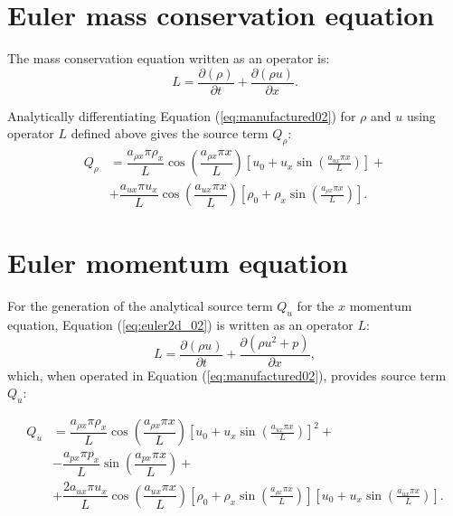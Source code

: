 \documentclass[10pt]{article}
\newcommand{\Diff}[2] {\dfrac{\partial( #1)}{\partial #2}}
\begin{document}
\section{Euler mass conservation equation}

The mass conservation equation written as an operator is:
\begin{equation}
 \label{eq:euler2d_11}
L= \Diff{\rho}{t} + \Diff{\rho u}{x}.
\end{equation}

Analytically differentiating Equation (\ref{eq:manufactured02}) for $\rho$ and $u$  using operator $L$ defined above gives  the source term $Q_{\rho}$:
\begin{equation}
\begin{split}
Q_\rho &=\dfrac{a_{\rho x} \pi \rho_x }{L} \cos\left( \dfrac{a_{\rho x} \pi x}{L} \right) \left[ u_{0}+u_{x} \sin\left(\frac{a_{u  x} \pi x}{L}\right) \right] +\\
&+\dfrac{a_{ux} \pi u_x }{L} \cos\left( \dfrac{a_{ux} \pi x}{L} \right) \left[  \rho_{0}+ \rho_{x} \sin\left(\frac{a_{ \rho  x} \pi x}{L}\right) \right] 
.
\end{split}
\end{equation}


\section{Euler momentum equation}

For the generation of the analytical source term $Q_u$ for the $x$ momentum equation, Equation  (\ref{eq:euler2d_02}) is written as an  operator $L$:
\begin{equation}
 \label{eq:euler2d_12}
L=\Diff{\rho u}{t} + \Diff{\rho u^2 + p}{x},
\end{equation}
which, when operated in Equation (\ref{eq:manufactured02}), provides source term $Q_{u}$:

\begin{equation}
\begin{split}
Q_u &=  
\dfrac{a_{\rho x} \pi \rho_x }{L}\cos\left( \dfrac{a_{\rho x} \pi x}{L} \right) \left[ u_{0}+u_{x} \sin\left(\frac{a_{u  x} \pi x}{L}\right) \right]^2  +\\
&-\dfrac{a_{px} \pi p_x }{L} \sin\left( \dfrac{a_{px} \pi x}{L} \right)  +\\
&+\dfrac{2a_{ux} \pi u_x }{L}\cos\left( \dfrac{a_{ux} \pi x}{L} \right) \left[  \rho_{0}+ \rho_{x} \sin\left(\frac{a_{ \rho  x} \pi x}{L}\right) \right] \left[ u_{0}+u_{x} \sin\left(\frac{a_{u  x} \pi x}{L}\right) \right].
\end{split}
 \end{equation}
\end{document}
